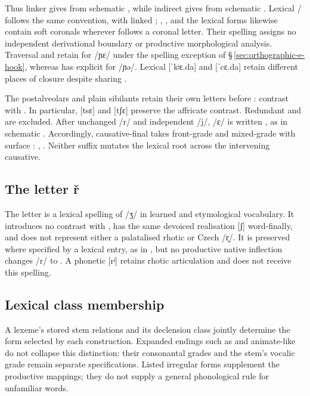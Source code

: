 Thus linker  gives  from schematic ,
while indirect  gives  from schematic .
Lexical / follows the same convention, with
linked ; , , and the lexical
forms 
likewise contain soft coronals wherever  follows a coronal letter.
Their spelling assigns no independent derivational boundary or productive
morphological analysis. Traversal  and  retain
 for /ɲɛ/ under the spelling exception of
§\,\ref{sec:orthographic-e-hook}, whereas  has explicit
 for /ɲə/. Lexical  [ˈkʲɛ.da] and 
[ˈcɛ.da] retain different places of closure despite sharing .

The postalveolars and plain sibilants retain their own letters before
:  contrast with .
In particular,  [tsɛ] and  [tʃɛ] preserve the
affricate contrast.
Redundant  and 
are excluded.
After unchanged /r/ and independent /j/, /ɛ/ is written , as in
schematic . Accordingly, causative-final  takes
front-grade  and mixed-grade  with surface :
, . Neither suffix mutates the lexical
root across the intervening causative.

\subsection{The letter ř}\label{sec:r-hook}

The letter  is a lexical spelling of /ʒ/ in learned and
etymological vocabulary. It introduces no contrast with , has the
same devoiced realisation [ʃ] word-finally, and does not represent either
a palatalised rhotic or Czech /r̝/. It is preserved where specified by a
lexical entry, as in , but no productive native inflection
changes /r/ to . A phonetic [rʲ] retains rhotic articulation and
does not receive this spelling.

\subsection{Lexical class membership}

A lexeme's stored stem relations and its declension class jointly determine the
form selected by each construction. Expanded endings such as 
and animate-like  do not collapse this distinction: their
consonantal grades and the stem's vocalic grade remain separate
specifications. Listed irregular forms supplement the productive mappings;
they do not supply a general phonological rule for unfamiliar words.

